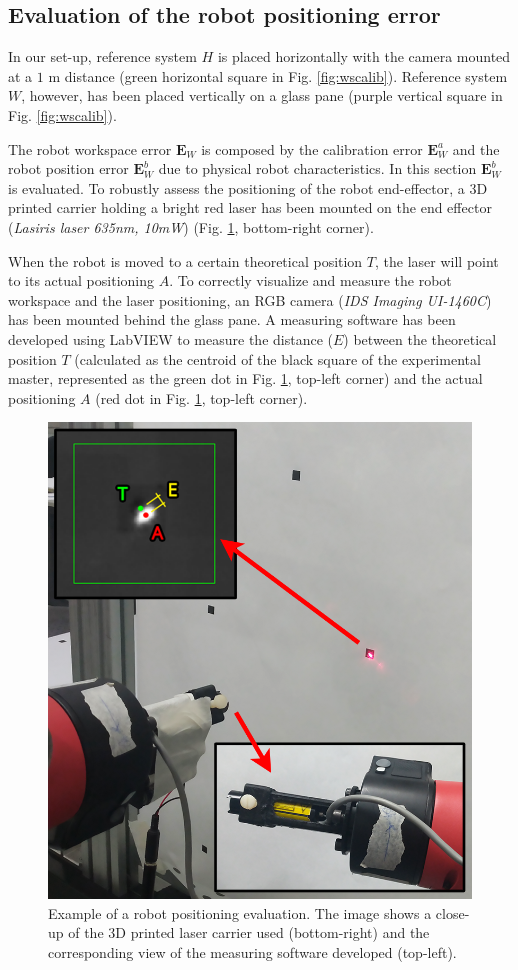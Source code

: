 \documentclass[a4paper, 10 pt, conference]{ieeeconf}      %
\begin{document}
\subsection{Evaluation of the robot positioning error}

In our set-up, reference system $H$ is placed horizontally with the camera mounted at a $1$ m distance (green horizontal square in Fig. \ref{fig:wscalib}). Reference system $W$, however, has been placed vertically on a glass pane (purple vertical square in Fig. \ref{fig:wscalib}).

The robot workspace error $\mathbf{E}_{W}$ is composed by the calibration error $\mathbf{E}^a_{W}$ and the robot position error $\mathbf{E}^b_{W}$ due to physical robot characteristics. In this section $\mathbf{E}^b_{W}$ is evaluated. To robustly assess the positioning of the robot end-effector, a 3D printed carrier holding a bright red laser has been mounted on the end effector (\textit{Lasiris laser 635nm, 10mW}) (Fig. \ref{fig:laser}, bottom-right corner).

When the robot is moved to a certain theoretical position $T$, the laser will point to its actual positioning $A$. To correctly visualize and measure the robot workspace and the laser positioning, an RGB camera (\textit{IDS Imaging UI-1460C}) has been mounted behind the glass pane.
A measuring software has been developed using LabVIEW to measure the distance ($E$) between the theoretical position $T$ (calculated as the centroid of the black square of the experimental master, represented as the green dot in Fig. \ref{fig:laser}, top-left corner) and the actual positioning $A$ (red dot in Fig. \ref{fig:laser}, top-left corner).

\begin{figure} [ht]
  \centering
  \includegraphics[width=0.7\columnwidth]{figures/lasermount}
  \caption{Example of a robot positioning evaluation. The image shows a close-up of the 3D printed laser carrier used (bottom-right) and the corresponding view of the measuring software developed (top-left).}
  \label{fig:laser}
\end{figure}
\end{document}
